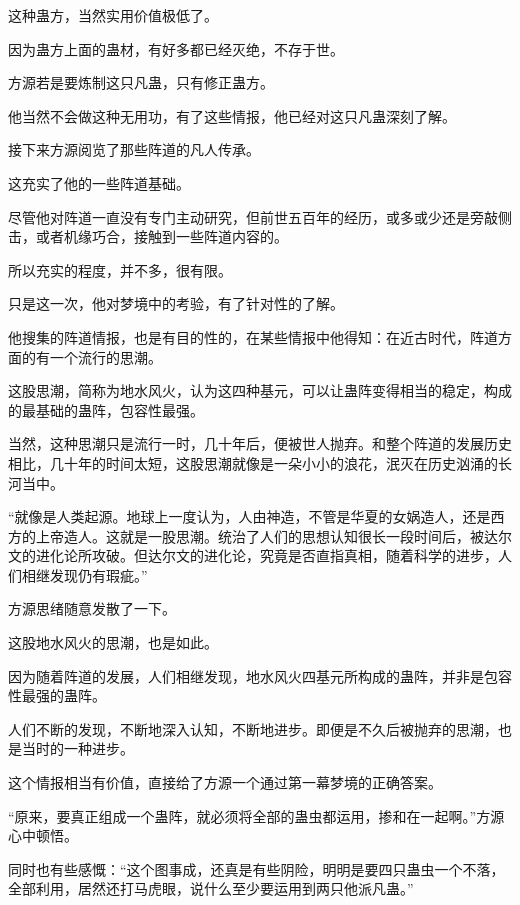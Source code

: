 
\begin{this_body}

这种蛊方，当然实用价值极低了。

因为蛊方上面的蛊材，有好多都已经灭绝，不存于世。

方源若是要炼制这只凡蛊，只有修正蛊方。

他当然不会做这种无用功，有了这些情报，他已经对这只凡蛊深刻了解。

接下来方源阅览了那些阵道的凡人传承。

这充实了他的一些阵道基础。

尽管他对阵道一直没有专门主动研究，但前世五百年的经历，或多或少还是旁敲侧击，或者机缘巧合，接触到一些阵道内容的。

所以充实的程度，并不多，很有限。

只是这一次，他对梦境中的考验，有了针对性的了解。

他搜集的阵道情报，也是有目的性的，在某些情报中他得知：在近古时代，阵道方面的有一个流行的思潮。

这股思潮，简称为地水风火，认为这四种基元，可以让蛊阵变得相当的稳定，构成的最基础的蛊阵，包容性最强。

当然，这种思潮只是流行一时，几十年后，便被世人抛弃。和整个阵道的发展历史相比，几十年的时间太短，这股思潮就像是一朵小小的浪花，泯灭在历史汹涌的长河当中。

“就像是人类起源。地球上一度认为，人由神造，不管是华夏的女娲造人，还是西方的上帝造人。这就是一股思潮。统治了人们的思想认知很长一段时间后，被达尔文的进化论所攻破。但达尔文的进化论，究竟是否直指真相，随着科学的进步，人们相继发现仍有瑕疵。”

方源思绪随意发散了一下。

这股地水风火的思潮，也是如此。

因为随着阵道的发展，人们相继发现，地水风火四基元所构成的蛊阵，并非是包容性最强的蛊阵。

人们不断的发现，不断地深入认知，不断地进步。即便是不久后被抛弃的思潮，也是当时的一种进步。

这个情报相当有价值，直接给了方源一个通过第一幕梦境的正确答案。

“原来，要真正组成一个蛊阵，就必须将全部的蛊虫都运用，掺和在一起啊。”方源心中顿悟。

同时也有些感慨：“这个图事成，还真是有些阴险，明明是要四只蛊虫一个不落，全部利用，居然还打马虎眼，说什么至少要运用到两只他派凡蛊。”


\end{this_body}
